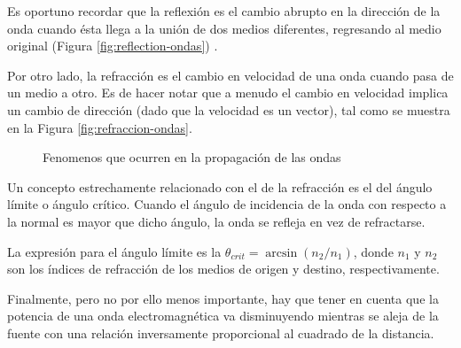 Es oportuno recordar que la reflexi\'on es el cambio abrupto en la direcci\'on de la onda cuando \'esta llega a la uni\'on de dos medios diferentes, regresando al medio original (Figura \ref{fig:reflection-ondas}) . 

Por otro lado, la refracci\'on es el cambio en velocidad de una onda cuando pasa de un medio a otro. Es de hacer notar que a menudo el cambio en velocidad implica un cambio de direcci\'on (dado que la velocidad es un vector), tal como se muestra en la Figura \ref{fig:refraccion-ondas}.

\begin{figure}[!h]
  \centering
  \caption{Fenomenos que ocurren en la propagaci\'on de las ondas}
\end{figure}

Un concepto estrechamente relacionado con el de la refracci\'on es el del \'angulo l\'imite o \'angulo cr\'itico. Cuando el \'angulo de incidencia de la onda con respecto a la normal es mayor que dicho \'angulo, la onda se refleja en vez de refractarse.

La expresi\'on para el \'angulo l\'imite es la  $ \theta_{crit} = \arcsin(n_2/n_1) $, donde $n_1$ y $n_2$ son los \'indices de refracci\'on de los medios de origen y destino, respectivamente.

Finalmente, pero no por ello menos importante, hay que tener en cuenta que la potencia de una onda electromagn\'etica va disminuyendo mientras se aleja de la fuente con una relaci\'on inversamente proporcional al cuadrado de la distancia.

